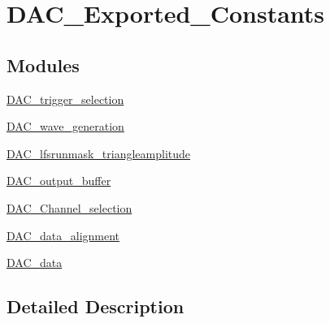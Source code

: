 \hypertarget{group___d_a_c___exported___constants}{}\section{D\+A\+C\+\_\+\+Exported\+\_\+\+Constants}
\label{group___d_a_c___exported___constants}
\subsection*{Modules}
\begin{DoxyCompactItemize}
\item 
\hyperlink{group___d_a_c__trigger__selection}{D\+A\+C\+\_\+trigger\+\_\+selection}
\item 
\hyperlink{group___d_a_c__wave__generation}{D\+A\+C\+\_\+wave\+\_\+generation}
\item 
\hyperlink{group___d_a_c__lfsrunmask__triangleamplitude}{D\+A\+C\+\_\+lfsrunmask\+\_\+triangleamplitude}
\item 
\hyperlink{group___d_a_c__output__buffer}{D\+A\+C\+\_\+output\+\_\+buffer}
\item 
\hyperlink{group___d_a_c___channel__selection}{D\+A\+C\+\_\+\+Channel\+\_\+selection}
\item 
\hyperlink{group___d_a_c__data__alignment}{D\+A\+C\+\_\+data\+\_\+alignment}
\item 
\hyperlink{group___d_a_c__data}{D\+A\+C\+\_\+data}
\end{DoxyCompactItemize}


\subsection{Detailed Description}
